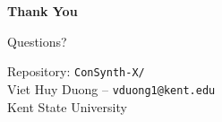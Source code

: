 \documentclass[aspectratio=169, 10pt]{beamer}
\begin{document}
\begin{frame}{}
\centering
\vspace{2cm}
{\Huge\bfseries Thank You}

\vspace{1cm}
{\large Questions?}

\vspace{1cm}
{\footnotesize
Repository: \texttt{ConSynth-X/}\\
Viet Huy Duong -- \texttt{vduong1@kent.edu}\\
Kent State University
}
\end{frame}
\end{document}
